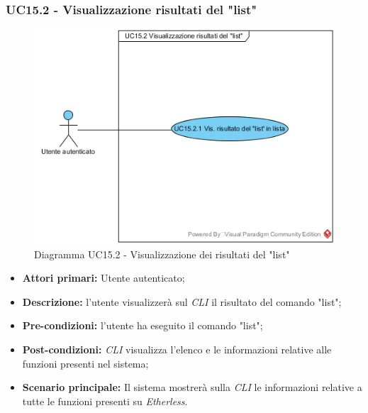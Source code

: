 \subsubsection{UC15.2 - Visualizzazione risultati del "list"}
\begin{figure}[h]
	\centering
	\includegraphics[width=0.7\linewidth]{res/img/UC15.2.jpg}
	\caption{Diagramma UC15.2 - Visualizzazione dei risultati del "list"}
\end{figure}
\begin{itemize}
	\item \textbf{Attori primari:} Utente autenticato;
	\item \textbf{Descrizione:} l'utente visualizzerà sul \textit{CLI\glo} il risultato del comando "list";
	\item \textbf{Pre-condizioni:} l'utente ha eseguito il comando "list";
	\item \textbf{Post-condizioni:} \textit{CLI\glo} visualizza l'elenco e le informazioni relative alle funzioni presenti nel sistema;
	\item \textbf{Scenario principale:} Il sistema mostrerà sulla \textit{CLI\glo} le informazioni relative a tutte le funzioni presenti su \textit{Etherless\glos}.
\end{itemize}
